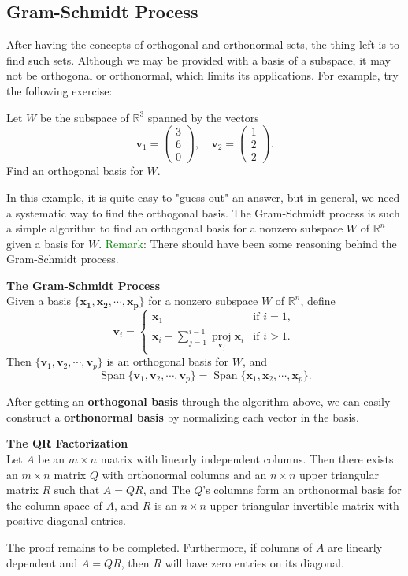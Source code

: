 \documentclass[10pt, a4paper]{article}
\newcommand{\R}{\mathbb{R}}
\newcommand{\vt}[1]{\mathbf{#1}}
\begin{document}
\subsection{Gram-Schmidt Process}
\indent After having the concepts of orthogonal and orthonormal sets, the thing left is to find such sets. Although we may be provided with a basis of a subspace, it may not be orthogonal or orthonormal, which limits its applications. For example, try the following exercise:
\begin{example}
    Let $W$ be the subspace of $\R^3$ spanned by the vectors\[
    \vt{v}_1 = \begin{pmatrix}
        3\\6\\0
    \end{pmatrix}, \quad \vt{v}_2 = \begin{pmatrix}
        1\\2\\2
    \end{pmatrix}.
    \]
    Find an orthogonal basis for $W$.
\end{example}
\indent In this example, it is quite easy to "guess out" an answer, but in general, we need a systematic way to find the orthogonal basis. The Gram-Schmidt process is such a simple algorithm to find an orthogonal basis for a nonzero subspace $W$ of $\R^n$ given a basis for $W$.
\indent \textcolor{Green}{Remark}: There should have been some reasoning behind the Gram-Schmidt process.
\begin{proposition}
    \textbf{The Gram-Schmidt Process}\\
    Given a basis $\{\vt{x_1}, \vt{x_2}, \cdots, \vt{x_p}\}$ for a nonzero subspace $W$ of $\R^n$, define\[\vt{v}_i = 
    \begin{cases}
        \vt{x}_1 & \text{if } i = 1,\\
        \vt{x}_i - \sum_{j=1}^{i-1}\operatorname*{proj}_{\vt{v}_j}\vt{x}_i & \text{if } i > 1.
    \end{cases}
    \]
    Then $\{\vt{v}_1, \vt{v}_2, \cdots, \vt{v}_p\}$ is an orthogonal basis for $W$, and \[
    \operatorname*{Span}\{ \vt{v}_1, \vt{v}_2, \cdots, \vt{v}_p\} = \operatorname*{Span}\{ \vt{x}_1, \vt{x}_2, \cdots, \vt{x}_p\}.
    \]
\end{proposition}
\indent After getting an \textbf{orthogonal basis} through the algorithm above, we can easily construct a \textbf{orthonormal basis} by normalizing each vector in the basis.
\begin{proposition}
    \textbf{The QR Factorization}\\
    Let $A$ be an $m\times n$ matrix with linearly independent columns. Then there exists an $m\times n$ matrix $Q$ with orthonormal columns and an $n\times n$ upper triangular matrix $R$ such that $A=QR$, and
    The $Q$'s columns form an orthonormal basis for the column space of $A$, and $R$ is an $n\times n$ upper triangular invertible matrix with positive diagonal entries.
\end{proposition}
\indent The proof remains to be completed. Furthermore, if columns of $A$ are linearly dependent and $A=QR$, then $R$ will have zero entries on its diagonal.\\
\end{document}
